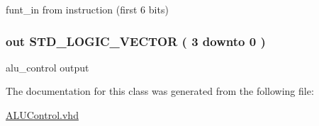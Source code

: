 funt\-\_\-in from instruction (first 6 bits) 

\hypertarget{class_a_l_u___control_a770899168989eb2b8a2d815fbd0a3a17}{
\subsubsection[{\-A\-L\-U\-\_\-\-Control\-\_\-out}]{ {\bfseries out } {\bfseries \-S\-T\-D\-\_\-\-L\-O\-G\-I\-C\-\_\-\-V\-E\-C\-T\-O\-R (   3    downto    0  ) } }}\label{class_a_l_u___control_a770899168989eb2b8a2d815fbd0a3a17}


alu\-\_\-control output 



\-The documentation for this class was generated from the following file\-:\begin{DoxyCompactItemize}
\item 
\hyperlink{_a_l_u_control_8vhd}{\-A\-L\-U\-Control.\-vhd}\end{DoxyCompactItemize}
